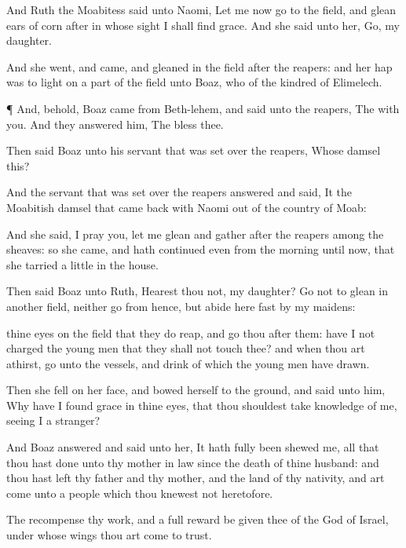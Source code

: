 {And
Ruth the
Moabitess
said unto
Naomi, Let me now
go to the
field, and
glean ears of
corn
after
{} in whose
sight I shall
find
grace. And she
said unto her,
Go, my
daughter.

And she
went, and
came, and
gleaned in the
field
after the
reapers: and her
hap was to
light on a
part of the
field
{} unto
Boaz, who
{} of the
kindred of
Elimelech.


\par }{\PP {}¶ And, behold,
Boaz
came from
Beth-lehem, and
said unto the
reapers, The
{}
{} with you. And they
answered him, The
{}
bless thee.

Then
said
Boaz unto his
servant that was
set over the
reapers, Whose
damsel
{} this?

And the
servant that was
set over the
reapers
answered and
said, It
{} the
Moabitish
damsel that came
back with
Naomi out of the
country of
Moab:

And she
said, I pray you, let me
glean and
gather
after the
reapers among the
sheaves: so she
came, and hath
continued
even from the
morning until now, that she
tarried a
little in the
house.

Then
said
Boaz unto
Ruth,
Hearest thou not, my
daughter?
Go not to
glean in
another
field, neither
go from hence, but
abide here fast by my
maidens:

 thine
eyes
{} on the
field that they do
reap, and
go thou
after them: have I not
charged the young
men that they shall not
touch thee? and when thou art
athirst,
go unto the
vessels, and
drink of
{} which the young
men have
drawn.

Then she
fell on her
face, and
bowed herself to the
ground, and
said unto him, Why have I
found
grace in thine
eyes, that thou shouldest take
knowledge of me, seeing I
{} a
stranger?

And
Boaz
answered and
said unto her, It hath
fully been
shewed me, all that thou hast
done unto thy mother in
law
since the
death of thine
husband: and
{} thou hast
left thy
father and thy
mother, and the
land of thy
nativity, and art
come unto a
people which thou
knewest not
heretofore.

The
{}
recompense thy
work, and a
full
reward be given thee of the
{}
God of
Israel, under whose
wings thou art
come to
trust.

}
